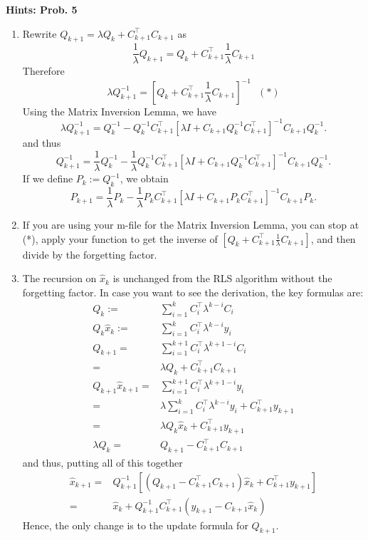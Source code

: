 \documentclass[letterpaper]{article}
\begin{document}
\noindent \textbf{Hints: Prob. 5 }
 \begin{enumerate}
\setlength{\itemsep}{.1in}
\renewcommand{\labelenumi}{(\alph{enumi})}

\item Rewrite $ Q_{k+1} = \lambda Q_k + C_{k+1}^\top C_{k+1}$ as
$$ \frac{1}{\lambda} Q_{k+1} = Q_k + C_{k+1}^\top \frac{1}{\lambda}  C_{k+1}$$
Therefore
$$ {\lambda} Q_{k+1} ^{-1} = [Q_k + C_{k+1}^\top \frac{1}{\lambda}  C_{k+1}]^{-1}~~~(*)$$
Using the Matrix Inversion Lemma, we have
$$ {\lambda}Q_{k+1}^{-1} = Q_k^{-1} -  Q_k^{-1}C_{k+1}^\top [\lambda I +  C_{k+1}  Q_k^{-1}  C_{k+1}^\top ]^{-1} C_{k+1} Q_k^{-1}.$$
and thus
$$ Q_{k+1} ^{-1} = \frac{1}{\lambda}  Q_k^{-1} -  \frac{1}{\lambda}  Q_k^{-1}C_{k+1}^\top [\lambda I +  C_{k+1}  Q_k^{-1}  C_{k+1}^\top ]^{-1} C_{k+1} Q_k^{-1}.$$
If we define $P_k:=Q_k^{-1}$, we obtain
$$ P_{k+1}  = \frac{1}{\lambda}  P_k -  \frac{1}{\lambda}  P_k C_{k+1}^\top [\lambda I +  C_{k+1}  P_k  C_{k+1}^\top ]^{-1} C_{k+1} P_k.$$
\item If you are using your m-file for the Matrix Inversion Lemma, you can stop at (*), apply your function to get the inverse of $ [Q_k + C_{k+1}^\top \frac{1}{\lambda}  C_{k+1}]$, and
then divide by the forgetting factor.

\item The recursion on $\hat{x}_k$ is unchanged from the RLS algorithm without the forgetting factor. In case you want to see the derivation, the key formulas are:
    \begin{align*}
    Q_k := &\sum_{i=1}^k C_i^\top \lambda^{k-i} C_i \\
Q_k \hat{x}_k :=&\sum_{i=1}^k C_i^\top \lambda^{k-i} y_i \\
Q_{k+1}  = &\sum_{i=1}^{k+1} C_i^\top \lambda^{k+1-i} C_i \\
 =& \lambda Q_k + C_{k+1}^\top C_{k+1} \\
 Q_{k+1} \hat{x}_{k+1} =&\sum_{i=1}^{k+1} C_i^\top \lambda^{k+1-i} y_i \\
 = & \lambda \sum_{i=1}^k C_i^\top \lambda^{k-i} y_i + C_{k+1}^\top y_{k+1} \\
 =& \lambda Q_k \hat{x}_k +  C_{k+1}^\top y_{k+1}     \\
  \lambda Q_k = & Q_{k+1} - C_{k+1}^\top C_{k+1}
    \end{align*}
    and thus, putting all of this together
    \begin{align*}
    \hat{x}_{k+1} = & Q_{k+1}^{-1} \left[ \left( Q_{k+1} - C_{k+1}^\top C_{k+1} \right) \hat{x}_k + C_{k+1}^\top y_{k+1} \right] \\
 =  &\hat{x}_k + Q_{k+1}^{-1} C_{k+1}^\top \left( y_{k+1} - C_{k+1} \hat{x}_k \right)
    \end{align*}
    Hence, the only change is to the update formula for $Q_{k+1}$.

\end{enumerate}

\newpage

\end{document}
